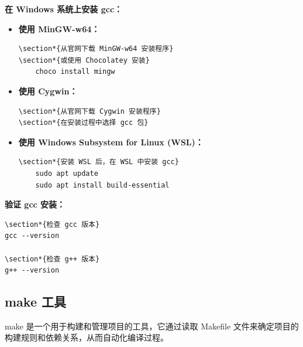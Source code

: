 \documentclass[12pt,UTF8]{ctexbook}
\begin{document}
\textbf{在 Windows 系统上安装 gcc：}
\begin{itemize}
    \item \textbf{使用 MinGW-w64：}
    \begin{verbatim}
\section*{从官网下载 MinGW-w64 安装程序}
\section*{或使用 Chocolatey 安装}
    choco install mingw
    \end{verbatim}
    \item \textbf{使用 Cygwin：}
    \begin{verbatim}
\section*{从官网下载 Cygwin 安装程序}
\section*{在安装过程中选择 gcc 包}
    \end{verbatim}
    \item \textbf{使用 Windows Subsystem for Linux (WSL)：}
    \begin{verbatim}
\section*{安装 WSL 后，在 WSL 中安装 gcc}
    sudo apt update
    sudo apt install build-essential
    \end{verbatim}
\end{itemize}

\textbf{验证 gcc 安装：}
\begin{verbatim}
\section*{检查 gcc 版本}
gcc --version

\section*{检查 g++ 版本}
g++ --version
\end{verbatim}

\subsection{make 工具}
make 是一个用于构建和管理项目的工具，它通过读取 Makefile 文件来确定项目的构建规则和依赖关系，从而自动化编译过程。
\end{document}
